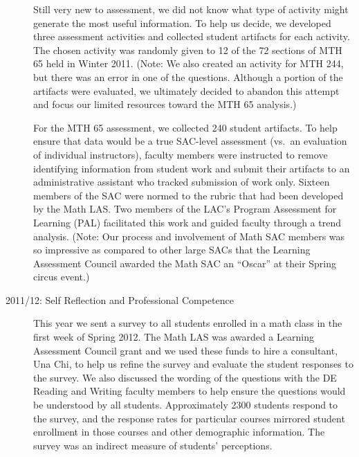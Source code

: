 \begin{description}
Still very new to assessment, we did not know what type of activity might generate the most useful information.  To help us decide, we developed three assessment activities and collected student artifacts for each activity.  The chosen activity was randomly given to 12 of the 72 sections of MTH 65 held in Winter 2011.  (Note: We also created an activity for MTH 244, but there was an error in one of the questions.  Although a portion of the artifacts were evaluated, we ultimately decided to abandon this attempt and focus our limited resources toward the MTH 65 analysis.)

For the MTH 65 assessment, we collected 240 student artifacts.  To help ensure that data would be a true SAC-level assessment (vs.\ an evaluation of individual instructors), faculty members were instructed to remove identifying information from student work and submit their artifacts to an administrative assistant who tracked submission of work only.  Sixteen members of the SAC were normed to the rubric that had been developed by the Math LAS.  Two members of the LAC's Program Assessment for Learning (PAL) facilitated this work and guided faculty through a trend analysis.  (Note: Our process and involvement of Math SAC members was so impressive as compared to other large SACs that the Learning Assessment Council awarded the Math SAC an ``Oscar'' at their Spring circus event.)

\item[2011/12: Self Reflection and Professional Competence]

This year we sent a survey to all students enrolled in a math class in the first week of Spring 2012.  The Math LAS was awarded a Learning Assessment Council grant and we used these funds to hire a consultant, Una Chi, to help us refine the survey and evaluate the student responses to the survey.  We also discussed the wording of the questions with the DE Reading and Writing faculty members to help ensure the questions would be understood by all students. Approximately 2300 students respond to the survey, and the response rates for particular courses mirrored student enrollment in those courses and other demographic information.  The survey was an indirect measure of students' perceptions.  


\end{description}
